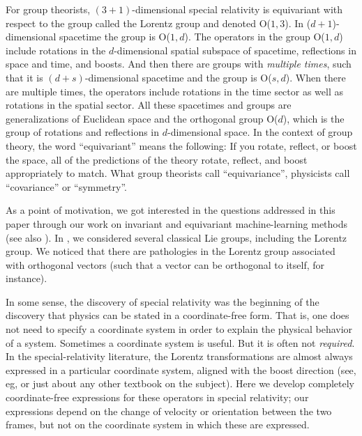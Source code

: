 \documentclass{article}
\newcommand{\plus}{\!+\!} %
\begin{document}
For group theorists, $(3\plus1)$-dimensional special relativity is equivariant with respect to the group called the Lorentz group and denoted O($1,3$).
In ($d\plus1$)-dimensional spacetime the group is O($1,d$).
The operators in the group O($1,d$) include rotations in the $d$-dimensional spatial subspace of spacetime, reflections in space and time, and boosts. %
And then there are groups with \emph{multiple times}, such that it is $(d\plus s)$-dimensional spacetime and the group is O($s,d$).
When there are multiple times, the operators include rotations in the time sector as well as rotations in the spatial sector.
All these spacetimes and groups are generalizations of Euclidean space and the orthogonal group O($d$), which is the group of rotations and reflections in $d$-dimensional space.
In the context of group theory, the word ``equivariant'' means the following:
If you rotate, reflect, or boost the space, all of the predictions of the theory rotate, reflect, and boost appropriately to match.
What group theorists call ``equivariance'', physicists call ``covariance'' or ``symmetry''.

As a point of motivation, we got interested in the questions addressed in this paper through our work on invariant and equivariant machine-learning methods \cite{scalars} (see also \cite{gripaios2021lorentz, brehmer2024lorentz}).
In \cite{scalars}, we considered several classical Lie groups, including the Lorentz group.
We noticed that there are pathologies in the Lorentz group associated with orthogonal vectors (such that a vector can be orthogonal to itself, for instance).

In some sense, the discovery of special relativity was the beginning of the discovery that physics can be stated in a coordinate-free form.
That is, one does not need to specify a coordinate system in order to explain the physical behavior of a system.
Sometimes a coordinate system is useful.
But it is often not \emph{required}.
In the special-relativity literature, the Lorentz transformations are almost always expressed in a particular coordinate system, aligned with the boost direction (see, eg, \cite{french, zakamska} or just about any other textbook on the subject).
Here we develop completely coordinate-free expressions for these operators in special relativity; our expressions depend on the change of velocity or orientation between the two frames, but not on the coordinate system in which these are expressed.
\end{document}
